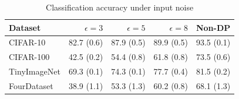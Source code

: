 \begin{table}[htbp]
\centering
\begin{tabular}{lrrrr}
\toprule
Dataset & $\epsilon=3$ & $\epsilon=5$ & $\epsilon=8$ & Non-DP \\
\midrule
CIFAR-10 & 82.7 (0.6) & 87.9 (0.5) & 89.9 (0.5) & 93.5 (0.1) \\
CIFAR-100 & 42.5 (0.2) & 54.4 (0.8) & 61.8 (0.8) & 73.5 (0.6) \\
TinyImageNet & 69.3 (0.1) & 74.3 (0.1) & 77.7 (0.4) & 81.5 (0.2) \\
FourDataset & 38.9 (1.1) & 53.3 (1.3) & 60.2 (0.8) & 68.1 (1.3) \\
\bottomrule
\end{tabular}
\caption{Classification accuracy under input noise}
\label{tab:table2}
\end{table}
